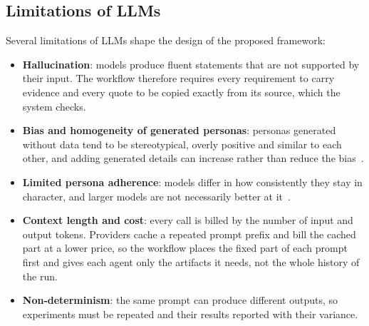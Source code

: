 \subsection{Limitations of LLMs}
\label{sec:bg-llm-limitations}

Several limitations of LLMs shape the design of the proposed framework:
\begin{itemize}
    \item \textbf{Hallucination}: models produce fluent statements that are not supported by their input. The workflow therefore requires every requirement to carry evidence and every quote to be copied exactly from its source, which the system checks.
    \item \textbf{Bias and homogeneity of generated personas}: personas generated without data tend to be stereotypical, overly positive and similar to each other, and adding generated details can increase rather than reduce the bias~\cite{li2026persona}.
    \item \textbf{Limited persona adherence}: models differ in how consistently they stay in character, and larger models are not necessarily better at it~\cite{samuel2025personagym}.
    \item \textbf{Context length and cost}: every call is billed by the number of input and output tokens. Providers cache a repeated prompt prefix and bill the cached part at a lower price, so the workflow places the fixed part of each prompt first and gives each agent only the artifacts it needs, not the whole history of the run.
    \item \textbf{Non-determinism}: the same prompt can produce different outputs, so experiments must be repeated and their results reported with their variance.
\end{itemize}
